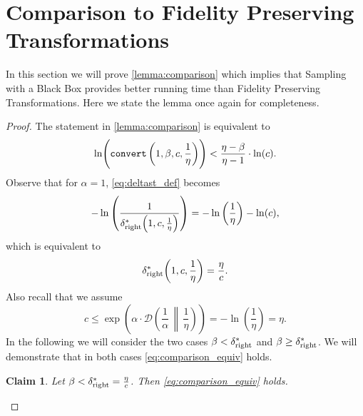 \documentclass[letterpaper,11pt]{article}
\newcommand{\1}[1]{\mathds{1}\left[#1\right]}
\newcommand{\runtime}[1][\alpha, \beta, c, q]{\textnormal{\texttt{convert}}\left(#1\right)}
\newcommand{\D}[2]{\mathcal{D}\left(#1\, \middle\|\,#2 \right)}
\newtheorem{claim}[theorem]{Claim}
\newcommand{\sdeltar}{\delta^{*}_{\textnormal{right}}}
\begin{document}
 
 
\section{Comparison to Fidelity Preserving Transformations}
\label{sec:fidelity_proof}
In this section we will prove \cref{lemma:comparison} which implies that Sampling with a Black Box provides better running time than Fidelity Preserving Transformations. 
Here we state the lemma once again for completeness.

\fidelitycomparison*

\begin{proof}
	The statement in \cref{lemma:comparison} is equivalent to
	\begin{equation}
		\ln\Biggl(\runtime[1,\beta,c,\frac{1}{\eta}]\Biggr) < \frac{\eta-\beta}{\eta - 1} \cdot \ln(c).\label{eq:comparison_equiv}
	\end{equation}
	Observe that for $\alpha = 1$, \eqref{eq:deltast_def} becomes
	\begin{equation*}
		-\ln\left( \frac{1}{\sdeltar\Bigl(1,c,\frac{1}{\eta}\Bigr)} \right) = -\ln\left( \frac{1}{\eta} \right)  - \ln(c),
	\end{equation*}
	which is equivalent to
	\begin{equation}\label{eq:sdeltar_simplified}
		\sdeltar\biggl(1,c,\frac{1}{\eta}\biggr) = \frac{\eta}{c}.
	\end{equation}
	Also recall that we assume
	\begin{equation}\label{eq:c_less_than_eta}
		c\leq  \exp\left(\alpha\cdot \D{\frac{1}{\alpha}}{\frac{1}{\eta}}\right) = -\ln\left( \frac{1}{\eta} \right) = \eta.
	\end{equation}
	In the following we will consider the two cases $\beta < \sdeltar$ and $\beta \geq \sdeltar$.
	We will demonstrate that in both cases \eqref{eq:comparison_equiv} holds.

	\begin{claim}\label{claim:beta_smaller_sdelta}
		Let $\beta < \sdeltar = \frac{\eta}{c}$. Then \eqref{eq:comparison_equiv} holds.
	\end{claim}


\end{proof}
\end{document}
